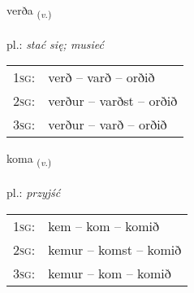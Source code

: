 \documentclass[frontgrid, backgrid]{flacards}\usepackage[]{graphicx}\usepackage[]{xcolor}
\begin{document}
{verða \small{\textsubscript{(\textit{v.})}} \\[1ex] %
\textphonetic{[vɛrða]} \\
pl.: \emph{stać się; musieć} \\  [2ex]
\renewcommand*{\arraystretch}{0.8}
\begin{tabular}{p{1cm}l}
\textsc{1sg}: & verð -- varð -- orðið \\ 
\textsc{2sg}: & verður -- varðst -- orðið \\ 
\textsc{3sg}: & verður -- varð -- orðið \\ 
\end{tabular}
}

\renewcommand{\flhead}{\vskip5pt \fboxsep=0pt {\small\bfseries\footnotesize Sagnorð | czasownik}}
\renewcommand{\fcfoot}{\vskip5pt \fboxsep=0pt \hspace{2pt}{\small\bfseries\footnotesize 1K}}

\renewcommand{\blhead}{\vskip5pt {\small\bfseries\footnotesize Sagnorð | czasownik }}
\renewcommand{\bcfoot}{\vskip5pt \hspace{2pt}{\small\bfseries\footnotesize 1K}}


{koma \small{\textsubscript{(\textit{v.})}} \\[1ex] %
\textphonetic{[kʰɔːma]} \\
pl.: \emph{przyjść} \\  [2ex]
\renewcommand*{\arraystretch}{0.8}
\begin{tabular}{p{1cm}l}
\textsc{1sg}: & kem -- kom -- komið \\ 
\textsc{2sg}: & kemur -- komst -- komið \\ 
\textsc{3sg}: & kemur -- kom -- komið \\ 
\end{tabular}
}

\renewcommand{\flhead}{\vskip5pt \fboxsep=0pt {\small\bfseries\footnotesize Fornafn | zaimek}}
\renewcommand{\fcfoot}{\vskip5pt \fboxsep=0pt \hspace{2pt}{\small\bfseries\footnotesize 1K}}
\end{document}
